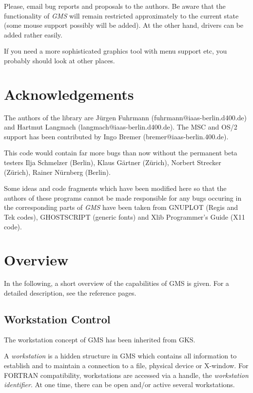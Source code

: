  
Please, email bug reports and proposals to the authors.
Be aware that the functionality of {\em GMS\/} will 
remain  restricted approximately to the current state
(some mouse support possibly will be added).
At the other hand, drivers can be added rather easily.

If you need a more sophisticated graphics tool
with menu support etc, you probably
should look at other places.








\section{Acknowledgements\label{ack}}The authors of the library are
J\"{u}rgen Fuhrmann  (fuhrmann@iaas-berlin.d400.de)
and 
Hartmut Langmach  (langmach@iaas-berlin.d400.de).
The MSC and OS/2 support has been  contributed by
Ingo Bremer    (bremer@iaas-berlin.400.de).

This code would contain far more bugs than now without the 
permanent beta testers
Ilja Schmelzer (Berlin),  
Klaus G\"{a}rtner (Z\"{u}rich),
Norbert Strecker (Z\"{u}rich),
Rainer N\"{u}rnberg (Berlin).





Some ideas and code fragments 
which have been modified here so that the authors of these
programs  cannot be made responsible for any bugs occuring
in the corresponding parts of {\em GMS\/}  have been taken
from   GNUPLOT (Regis and Tek codes),
GHOSTSCRIPT (generic fonts)
and 
Xlib Programmer's Guide (X11 code).




\section{Overview\label{overview}}In the following, a short overview of the capabilities of GMS
is given. For a detailed description, see the reference pages.




\subsection{Workstation Control\label{control}} 
The workstation concept of GMS has been inherited from GKS.

 
A {\em workstation\/}  is a hidden structure in GMS which contains all
information to establish and to maintain a connection to a file,
physical device or X-window. For FORTRAN compatibility, workstations
are accessed via a handle, the {\em  workstation identifier\/}. 
At one time, there can be open and/or  active several workstations.

